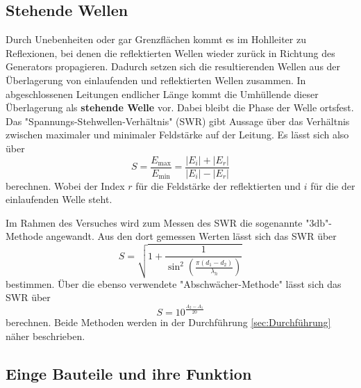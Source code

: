 \subsection{Stehende Wellen}

Durch Unebenheiten oder gar Grenzflächen kommt es im Hohlleiter zu Reflexionen, bei denen die reflektierten Wellen wieder zurück in Richtung des Generators propagieren. Dadurch setzen sich die resultierenden Wellen aus der Überlagerung von einlaufenden und reflektierten Wellen zusammen. In abgeschlossenen Leitungen endlicher Länge kommt die Umhüllende dieser Überlagerung als \textbf{stehende Welle} vor. Dabei bleibt die Phase der Welle ortsfest. Das "Spannungs-Stehwellen-Verhältnis" (SWR) gibt Aussage über das Verhältnis zwischen maximaler und minimaler Feldstärke auf der Leitung. Es lässt sich also über
\begin{equation}
    S = \frac{E_{\text{max}}}{E_{\text{min}}} = \frac{|E_i|+|E_r|}{|E_i|-|E_r|}
\end{equation}
berechnen. Wobei der Index $r$ für die Feldstärke der reflektierten und $i$ für die der einlaufenden Welle steht.


Im Rahmen des Versuches wird zum Messen des SWR die sogenannte "$3 \si{\decibel}$"- Methode angewandt. Aus den dort gemessen Werten lässt sich das SWR über
\begin{equation}
    S = \sqrt{1+\frac{1}{\sin^2\left(\frac{\pi(d_1-d_2)}{\lambda_h}\right)}}
\end{equation}
bestimmen. 
Über die ebenso verwendete "Abschwächer-Methode" lässt sich das SWR über
\begin{equation}
    S = 10^{\frac{A_2-A_1}{20}}
\end{equation}
berechnen.
Beide Methoden werden in der Durchführung \ref{sec:Durchführung} näher beschrieben.


\subsection{Einge Bauteile und ihre Funktion}

